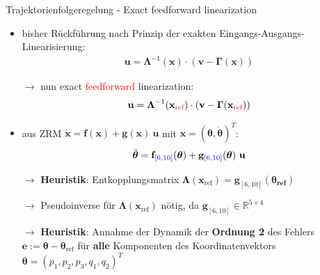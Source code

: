 \documentclass[
	ngerman,
	10pt,				%
	aspectratio=169, 	%
	xcolor=dvipsnames
]{beamer}
\begin{document}

\begin{frame}[t,fragile,label=trajektorienregelung_9]{\large Trajektorienfolgeregelung - Exact feedforward linearization}
	
	\begin{itemize}
		\item bisher Rückführung nach Prinzip der exakten Eingangs-Ausgangs-Linearisierung:
		\begin{align*}
			\mathbf{u} = \boldsymbol{\Lambda }^{-1}(\mathbf{x}) \cdot (\mathbf{v} - \boldsymbol{\Gamma}(\mathbf{x}))
		\end{align*}
		\pause
		\item[$\rightarrow$] nun exact \textcolor{red}{feedforward} linearization:
		\begin{align*}
			\mathbf{u} = \boldsymbol{\Lambda}^{-1}(\mathbf{x}_{\textcolor{red}{\text{ref}}}) \cdot (\mathbf{v} - \boldsymbol{\Gamma}(\mathbf{x}_{\textcolor{red}{\text{ref}}}))
		\end{align*}
		\pause
		\item aus ZRM $\dot{\mathbf{x}} = \mathbf{f}(\mathbf{x}) + \mathbf{g}(\mathbf{x}) \ \mathbf{u}$ mit $\mathbf{x} = (\boldsymbol{\theta}, \dot{\boldsymbol{\theta}})^T$:
		\begin{align*}
			\ddot{\boldsymbol{\theta}} = \mathbf{f}_{\textcolor{blue}{[6, 10]}}(\boldsymbol{\theta}) + \mathbf{g}_{\textcolor{blue}{[6, 10]}}(\boldsymbol{\theta}) \ \mathbf{u}
		\end{align*}
		\pause
		\item[$\rightarrow$] \textbf{Heuristik}: Entkopplungsmatrix $\boldsymbol{\Lambda}(\mathbf{x}_{\text{ref}}) = \mathbf{g}_{[6, 10]}(\boldsymbol{\theta_{\text{ref}}})$
		\pause
		\item[$\rightarrow$] Pseudoinverse für $\boldsymbol{\Lambda}(\mathbf{x}_{\text{ref}})$ nötig, da $\mathbf{g}_{[6, 10]} \in \mathbb{R}^{5 \times 4}$
		\pause
		\item[$\rightarrow$] \textbf{Heuristik}: Annahme der Dynamik der \textbf{Ordnung 2} des Fehlers $\mathbf{e} := \boldsymbol{\theta} - \boldsymbol{\theta}_{\text{ref}}$ für \textbf{alle} Komponenten des Koordinatenvektors $\boldsymbol{\theta} = (p_1, p_2, p_3, q_1, q_2)^T$
		
	\end{itemize}
	

\end{frame}
\end{document}
